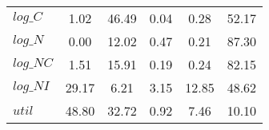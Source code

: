\begin{center}
\begin{longtable}{lccccc}
$log\_C          $	 & 	        1.02	 & 	       46.49	 & 	        0.04	 & 	        0.28	 & 	       52.17 \\ 
$log\_N          $	 & 	        0.00	 & 	       12.02	 & 	        0.47	 & 	        0.21	 & 	       87.30 \\ 
$log\_NC         $	 & 	        1.51	 & 	       15.91	 & 	        0.19	 & 	        0.24	 & 	       82.15 \\ 
$log\_NI         $	 & 	       29.17	 & 	        6.21	 & 	        3.15	 & 	       12.85	 & 	       48.62 \\ 
${util}          $	 & 	       48.80	 & 	       32.72	 & 	        0.92	 & 	        7.46	 & 	       10.10 \\ 
\end{longtable}
 \end{center}
